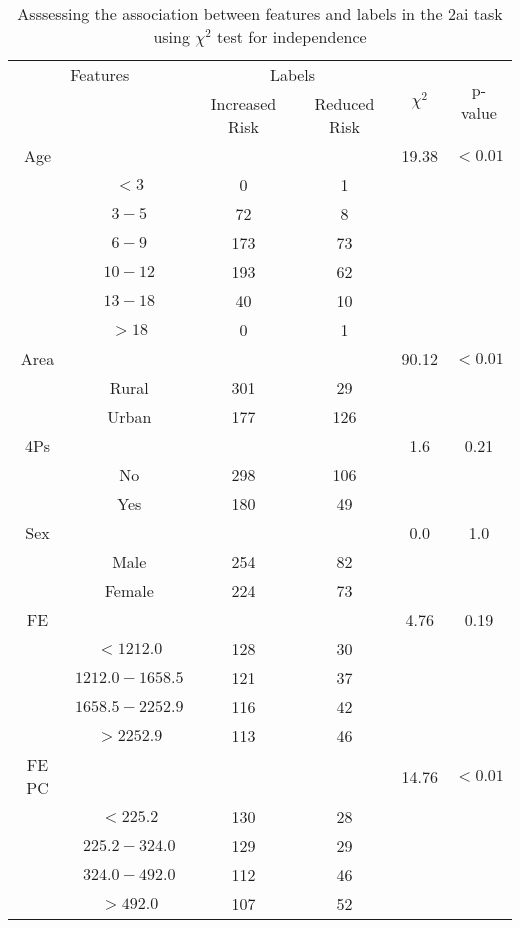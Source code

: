 \begin{table}[!htb]
\centering
\caption{Asssessing the association between features and labels in the 2ai task using $\chi^2$ test for independence}
\label{tab:chitest_2ai}
\begin{tabular}{c c | c c| c | c}
\hline
\multicolumn{2}{c|}{Features}& \multicolumn{2}{c|}{Labels}& \multirow{2}{*}{$\chi^2$} & \multirow{2}{*}{p-value}\\ 
& & Increased Risk & Reduced Risk & & \\ 
\hline
Age &  &  & & 19.38 & $< 0.01$ \\ 
& $< 3$ & 0 & 1& & \\ 
& $3-5$ & 72 & 8& & \\ 
& $6-9$ & 173 & 73& & \\ 
& $10-12$ & 193 & 62& & \\ 
& $13-18$ & 40 & 10& & \\ 
& $> 18$ & 0 & 1& & \\ 
\hline 
Area &  &  & & 90.12 & $< 0.01$ \\ 
& Rural & 301 & 29& & \\ 
& Urban & 177 & 126& & \\ 
\hline 
4Ps &  &  & & 1.6 & 0.21 \\ 
& No & 298 & 106& & \\ 
& Yes & 180 & 49& & \\ 
\hline 
Sex &  &  & & 0.0 & 1.0 \\ 
& Male & 254 & 82& & \\ 
& Female & 224 & 73& & \\ 
\hline 
FE &  &  & & 4.76 & 0.19 \\ 
& $< 1212.0$ & 128 & 30& & \\ 
& $1212.0-1658.5$ & 121 & 37& & \\ 
& $1658.5-2252.9$ & 116 & 42& & \\ 
& $> 2252.9$ & 113 & 46& & \\ 
\hline 
FE PC &  &  & & 14.76 & $< 0.01$ \\ 
& $< 225.2$ & 130 & 28& & \\ 
& $225.2-324.0$ & 129 & 29& & \\ 
& $324.0-492.0$ & 112 & 46& & \\ 
& $> 492.0$ & 107 & 52& & \\ 
\hline 
\end{tabular}
\end{table}
